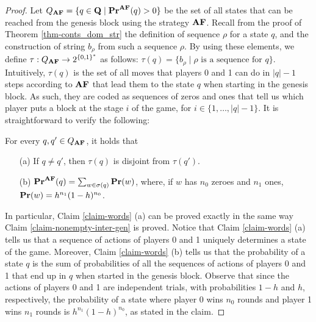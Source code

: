 \begin{proof}
Let $Q_{\text{\rm {\bf AF}}} = \{q \in \mathbf{Q} \mid \mathbf{Pr}^{\text{\rm {\bf AF}}}(q) > 0\}$ be the set of all states that can be reached from the genesis block using the strategy $\text{\rm {\bf AF}}$. Recall from the proof of Theorem \ref{thm-conts_dom_str} the definition of sequence $\rho$ for a state $q$, and the construction of string $b_\rho$ from such a sequence $\rho$.
By using these elements, we define $\tau:Q_{\text{\rm {\bf AF}}} \to 2^{\{0,1\}^*}$ as follows:
$\tau(q) = \{ b_\rho \mid \rho \text{ is a sequence for } q\}$.
Intuitively, $\tau(q)$ is the set of all moves that players 0 and 1 can do in $|q|-1$ steps according to $\text{\rm {\bf AF}}$ that lead them to the state $q$ when starting in the genesis block. As such, they are coded as sequences of zeros and ones that tell us which player puts a block at the stage $i$ of the game, for $i \in \{ 1,\ldots, |q|-1\}$. It is straightforward to verify the following:
\begin{myclaim}\label{claim-words} For every $q, q'\in Q_{\text{\rm {\bf AF}}}$, it holds that
\begin{itemize}
\item[(a)] If $q\neq q'$, then $\tau(q)$ is disjoint from $\tau(q')$.
\item[(b)]
$\mathbf{Pr}^{\text{\rm {\bf AF}}}(q) = \sum_{w \in \sigma(q)} \mathbf{Pr}(w)$, where, if $w$ has $n_0$ zeroes and $n_1$ ones, $\mathbf{Pr}(w)=h^{n_1}(1-h)^{n_0}$. 
\end{itemize}
\end{myclaim}
In particular, Claim \ref{claim-words} (a) can be proved exactly in the same way Claim \ref{claim-nonempty-inter-gen} is proved. Notice that Claim \ref{claim-words} (a)
tells us that a sequence of actions of players 0 and 1 uniquely determines a state of the game. 
Moreover, Claim \ref{claim-words} (b)
tells us that the probability of a state $q$ is the sum of probabilities of all the sequences of actions of players 0 and 1 that end up in $q$ when started in the genesis block. Observe that since the actions of players 0 and 1 are independent trials, with probabilities $1-h$ and $h$, respectively, the probability of a state where player 0 wins $n_0$ rounds and player 1 wins $n_1$ rounds is $h^{n_1}(1-h)^{n_0}$, as stated in the claim.



\end{proof}
